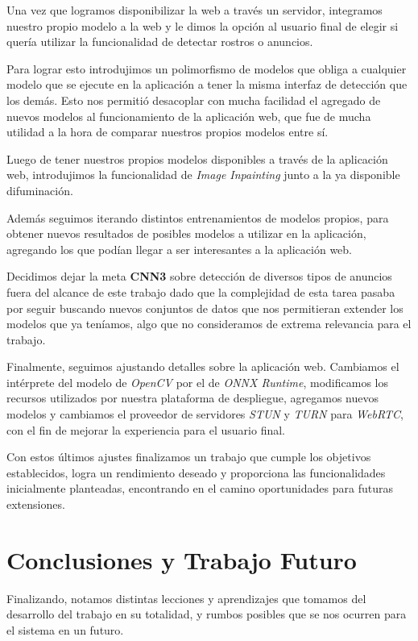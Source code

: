 \documentclass[a4paper]{article}
\begin{document}
\begin{itemize}
Una vez que logramos disponibilizar la web a través un servidor, integramos nuestro propio modelo a la web y le dimos la opción al usuario final de elegir si quería utilizar la funcionalidad de detectar rostros o anuncios.

Para lograr esto introdujimos un polimorfismo de modelos que obliga a cualquier modelo que se ejecute en la aplicación a tener la misma interfaz de detección que los demás. Esto nos permitió desacoplar con mucha facilidad el agregado de nuevos modelos al funcionamiento de la aplicación web, que fue de mucha utilidad a la hora de comparar nuestros propios modelos entre sí.

Luego de tener nuestros propios modelos disponibles a través de la aplicación web, introdujimos la funcionalidad de \textit{Image Inpainting} junto a la ya disponible difuminación.

Además seguimos iterando distintos entrenamientos de modelos propios, para obtener nuevos resultados de posibles modelos a utilizar en la aplicación, agregando los que podían llegar a ser interesantes a la aplicación web.

Decidimos dejar la meta \textbf{CNN3} sobre detección de diversos tipos de anuncios fuera del alcance de este trabajo dado que la complejidad de esta tarea pasaba por seguir buscando nuevos conjuntos de datos que nos permitieran extender los modelos que ya teníamos, algo que no consideramos de extrema relevancia para el trabajo.

Finalmente, seguimos ajustando detalles sobre la aplicación web. Cambiamos el intérprete del modelo de \textit{OpenCV} por el de \textit{ONNX Runtime}, modificamos los recursos utilizados por nuestra plataforma de despliegue, agregamos nuevos modelos y cambiamos el proveedor de servidores \textit{STUN} y \textit{TURN} para \textit{WebRTC}, con el fin de mejorar la experiencia para el usuario final.

Con estos últimos ajustes finalizamos un trabajo que cumple los objetivos establecidos, logra un rendimiento deseado y proporciona las funcionalidades inicialmente planteadas, encontrando en el camino oportunidades para futuras extensiones.

\end{itemize}

\section{Conclusiones y Trabajo Futuro}

Finalizando, notamos distintas lecciones y aprendizajes que tomamos del desarrollo del trabajo en su totalidad, y rumbos posibles que se nos ocurren para el sistema en un futuro. \medskip
\end{document}
